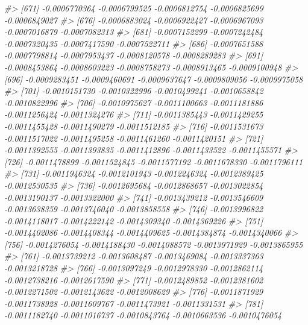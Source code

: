 \documentclass[
]{article}
\newenvironment{Shaded}{\begin{snugshade}}{\end{snugshade}}
\newcommand{\CommentTok}[1]{\textcolor[rgb]{0.56,0.35,0.01}{\textit{#1}}}
\begin{document}
\begin{Shaded}
\begin{Highlighting}[]
\CommentTok{\#\textgreater{} [671] {-}0.0006770364 {-}0.0006799525 {-}0.0006812754 {-}0.0006825699 {-}0.0006849027}
\CommentTok{\#\textgreater{} [676] {-}0.0006883024 {-}0.0006922427 {-}0.0006967093 {-}0.0007016879 {-}0.0007082313}
\CommentTok{\#\textgreater{} [681] {-}0.0007152299 {-}0.0007242484 {-}0.0007320435 {-}0.0007417590 {-}0.0007522711}
\CommentTok{\#\textgreater{} [686] {-}0.0007651588 {-}0.0007798814 {-}0.0007953437 {-}0.0008120578 {-}0.0008289283}
\CommentTok{\#\textgreater{} [691] {-}0.0008453864 {-}0.0008603223 {-}0.0008758273 {-}0.0008913465 {-}0.0009100948}
\CommentTok{\#\textgreater{} [696] {-}0.0009283451 {-}0.0009460691 {-}0.0009637647 {-}0.0009809056 {-}0.0009975058}
\CommentTok{\#\textgreater{} [701] {-}0.0010151730 {-}0.0010322996 {-}0.0010499241 {-}0.0010658842 {-}0.0010822996}
\CommentTok{\#\textgreater{} [706] {-}0.0010975627 {-}0.0011100663 {-}0.0011181886 {-}0.0011256424 {-}0.0011324276}
\CommentTok{\#\textgreater{} [711] {-}0.0011385443 {-}0.0011429255 {-}0.0011455428 {-}0.0011490279 {-}0.0011512185}
\CommentTok{\#\textgreater{} [716] {-}0.0011531673 {-}0.0011517022 {-}0.0011495258 {-}0.0011461260 {-}0.0011420151}
\CommentTok{\#\textgreater{} [721] {-}0.0011392555 {-}0.0011393835 {-}0.0011412896 {-}0.0011433522 {-}0.0011455571}
\CommentTok{\#\textgreater{} [726] {-}0.0011478899 {-}0.0011524845 {-}0.0011577192 {-}0.0011678330 {-}0.0011796111}
\CommentTok{\#\textgreater{} [731] {-}0.0011946324 {-}0.0012101943 {-}0.0012246324 {-}0.0012389425 {-}0.0012530535}
\CommentTok{\#\textgreater{} [736] {-}0.0012695684 {-}0.0012868657 {-}0.0013022854 {-}0.0013190137 {-}0.0013322000}
\CommentTok{\#\textgreater{} [741] {-}0.0013439212 {-}0.0013546609 {-}0.0013638359 {-}0.0013746040 {-}0.0013858558}
\CommentTok{\#\textgreater{} [746] {-}0.0013996822 {-}0.0014118017 {-}0.0014222142 {-}0.0014309340 {-}0.0014369226}
\CommentTok{\#\textgreater{} [751] {-}0.0014402086 {-}0.0014408344 {-}0.0014409625 {-}0.0014384874 {-}0.0014340066}
\CommentTok{\#\textgreater{} [756] {-}0.0014276054 {-}0.0014188430 {-}0.0014088572 {-}0.0013971929 {-}0.0013865955}
\CommentTok{\#\textgreater{} [761] {-}0.0013739212 {-}0.0013608487 {-}0.0013469084 {-}0.0013337363 {-}0.0013218728}
\CommentTok{\#\textgreater{} [766] {-}0.0013097249 {-}0.0012978330 {-}0.0012862114 {-}0.0012738216 {-}0.0012617590}
\CommentTok{\#\textgreater{} [771] {-}0.0012489852 {-}0.0012381602 {-}0.0012271502 {-}0.0012143622 {-}0.0012008629}
\CommentTok{\#\textgreater{} [776] {-}0.0011871929 {-}0.0011738928 {-}0.0011609767 {-}0.0011473921 {-}0.0011331531}
\CommentTok{\#\textgreater{} [781] {-}0.0011182740 {-}0.0011016737 {-}0.0010843764 {-}0.0010663536 {-}0.0010476054}

\end{Highlighting}
\end{Shaded}
\end{document}
